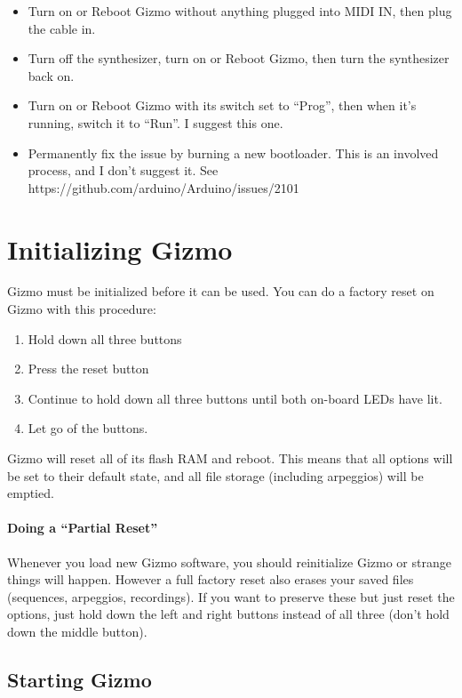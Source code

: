 \documentclass{article}
\begin{document}
\begin{itemize}
\item Turn on or Reboot Gizmo without anything plugged into MIDI IN, then plug the cable in.
\item Turn off the synthesizer, turn on or Reboot Gizmo, then turn the synthesizer back on.
\item Turn on or Reboot Gizmo with its switch set to ``Prog'', then when it's running, switch it to ``Run''.  I suggest this one.
\item Permanently fix the issue by burning a new bootloader.  This is an involved process, and I don't suggest it.  See https:/\!/github.com/arduino/Arduino/issues/2101
\end{itemize}


\clearpage

\clearpage
\section{Initializing Gizmo}

Gizmo must be initialized before it can be used.  You can do a factory reset on Gizmo with this procedure:

\begin{enumerate}
\item Hold down all three buttons
\item Press the reset button
\item Continue to hold down all three buttons until both on-board LEDs have lit.
\item Let go of the buttons.
\end{enumerate}

Gizmo will reset all of its flash RAM and reboot.  This means that all options will be set to their default state, and all file storage (including arpeggios) will be emptied.

\paragraph{Doing a ``Partial Reset''} Whenever you load new Gizmo software, you should reinitialize Gizmo or strange things will happen.  However a full factory reset also erases your saved files (sequences, arpeggios, recordings).  If you want to preserve these but just reset the options, just hold down the left and right buttons instead of all three (don't hold down the middle button).

\subsection{Starting Gizmo}
\end{document}

